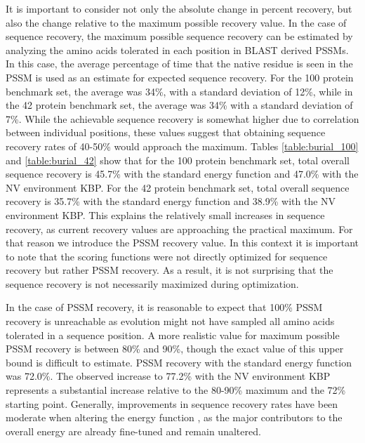 It is important to consider not only the absolute change in percent recovery, but also the change relative to the maximum possible recovery value.
In the case of sequence recovery, the maximum possible sequence recovery can be estimated by analyzing the amino acids tolerated in each position in BLAST derived PSSMs.
In this case, the average percentage of time that the native residue is seen in the PSSM is used as an estimate for expected sequence recovery.
For the 100 protein benchmark set, the average was 34\%, with a standard deviation of 12\%, while in the 42 protein benchmark set, the average was 34\% with a standard deviation of 7\%.
While the achievable sequence recovery is somewhat higher due to correlation between individual positions, these values suggest that obtaining sequence recovery rates of 40-50\% would approach the maximum.
Tables \ref{table:burial_100} and \ref{table:burial_42} show that for the 100 protein benchmark set, total overall sequence recovery is 45.7\% with the standard energy function and 47.0\% with the NV environment KBP.
For the 42 protein benchmark set, total overall sequence recovery is 35.7\% with the standard energy function and 38.9\% with the NV environment KBP.
This explains the relatively small increases in sequence recovery, as current recovery values are approaching the practical maximum.
For that reason we introduce the PSSM recovery value.
In this context it is important to note that the scoring functions were not directly optimized for sequence recovery but rather PSSM recovery.
As a result, it is not surprising that the sequence recovery is not necessarily maximized during optimization. 

In the case of PSSM recovery, it is reasonable to expect that 100\% PSSM recovery is unreachable as evolution might not have sampled all amino acids tolerated in a sequence position.
A more realistic value for maximum possible PSSM recovery is between 80\% and 90\%, though the exact value of this upper bound is difficult to estimate. PSSM recovery with the standard energy function was 72.0\%.
The observed increase to 77.2\% with the NV environment KBP represents a substantial increase relative to the 80-90\% maximum and the 72\% starting point.
Generally, improvements in sequence recovery rates have been moderate when altering the energy function \citep{Kortemme:2003td}, as the major contributors to the overall energy are already fine-tuned and remain unaltered. 

